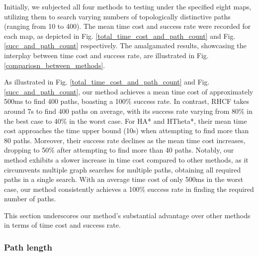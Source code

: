 \documentclass[letterpaper, 10 pt, journal, twoside]{IEEEtran}
\begin{document}

Initially, we subjected all four methods to testing under the specified eight maps, utilizing them to search varying numbers of topologically distinctive paths (ranging from 10 to 400). The mean time cost and success rate were recorded for each map, as depicted in Fig. \ref{total_time_cost_and_path_count} and Fig. \ref{succ_and_path_count} respectively. The amalgamated results, showcasing the interplay between time cost and success rate, are illustrated in Fig. \ref{compariosn_between_methods}.

As illustrated in Fig. \ref{total_time_cost_and_path_count} and Fig. \ref{succ_and_path_count}, our method achieves a mean time cost of approximately 500ms to find 400 paths, boasting a 100\% success rate. In contrast, RHCF takes around 7s to find 400 paths on average, with its success rate varying from 80\% in the best case to 40\% in the worst case. For HA* and HTheta*, their mean time cost approaches the time upper bound (10s) when attempting to find more than 80 paths. Moreover, their success rate declines as the mean time cost increases, dropping to 50\% after attempting to find more than 40 paths. Notably, our method exhibits a slower increase in time cost compared to other methods, as it circumvents multiple graph searches for multiple paths, obtaining all required paths in a single search. With an average time cost of only 500ms in the worst case, our method consistently achieves a 100\% success rate in finding the required number of paths.

This section underscores our method's substantial advantage over other methods in terms of time cost and success rate.

\subsubsection{Path length}
\end{document}
